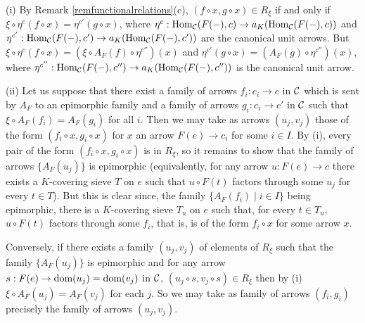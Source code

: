 \documentclass[a4paper,12pt]{article}
\begin{document}
\begin{proofs}
	(i) By Remark \ref{remfunctionalrelations}(c), $(f\circ x, g\circ x)\in R_{\xi}$ if and only if $\xi \circ \eta^{c} (f\circ x)=\eta^{c'}(g\circ x)$, where $\eta^{c}:\textup{Hom}_{\cal C}(F(-),c) \to a_{K}(\textup{Hom}_{\cal C}(F(-),c))$ and $\eta^{c'}:\textup{Hom}_{\cal C}(F(-),c') \to a_{K}(\textup{Hom}_{\cal C}(F(-),c'))$ are the canonical unit arrows. But $\xi \circ \eta^{c} (f\circ x)=(\xi\circ A_{F}(f)\circ \eta^{c''})(x)$ and $\eta^{c'}(g\circ x)=(A_{F}(g)\circ \eta^{c''})(x)$, where $\eta^{c''}:\textup{Hom}_{\cal C}(F(-),c'') \to a_{K}(\textup{Hom}_{\cal C}(F(-),c''))$ is the canonical unit arrow.
	
	(ii) Let us suppose that there exist a family of arrows $f_{i}:c_{i}\to c$ in $\cal C$ which is sent by $A_{F}$ to an epimorphic family and a family of arrows $g_{i}:c_{i}\to c'$ in $\cal C$ such that $\xi\circ A_{F}(f_{i})=A_{F}(g_{i})$ for all $i$. Then we may take as arrows $(u_{j}, v_{j})$ those of the form $(f_{i}\circ x, g_{i}\circ x)$ for $x$ an arrow $F(e)\to c_{i}$ for some $i\in I$. By (i), every pair of the form $(f_{i}\circ x, g_{i}\circ x)$ is in $R_{\xi}$, so it remains to show that the family of arrows $\{A_{F}(u_{j})\}$ is epimorphic (equivalently, for any arrow $u:F(e)\to c$ there exists a $K$-covering sieve $T$ on $e$ such that $u\circ F(t)$ factors through some $u_{j}$ for every $t\in T$). But this is clear since, the family $\{A_{F}(f_{i}) \mid i\in I \}$ being epimorphic, there is a $K$-covering sieve $T_{u}$ on $e$ such that, for every $t\in T_{u}$, $u\circ F(t)$ factors through some $f_{i}$, that is, is of the form $f_{i}\circ x$ for some arrow $x$. 
	
	Conversely, if there exists a family $(u_{j}, v_{j})$ of elements of $R_{\xi}$ such that the family $\{A_{F}(u_{j})\}$ is epimorphic and for any arrow $s:F(e)\to \textup{dom}(u_{j})=\textup{dom}(v_{j})$ in $\cal C$, $(u_{j}\circ s, v_{j}\circ s)\in R_{\xi}$ then by (i) $\xi\circ A_{F}(u_{j})=A_{F}(v_{j})$ for each $j$. So we may take as family of arrows $(f_{i}, g_{i})$ precisely the family of arrows $(u_{j}, v_{j})$.      
\end{proofs}
\end{document}
